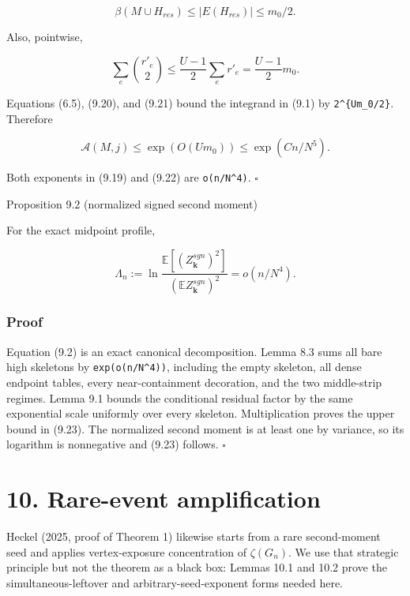 \documentclass[
  11pt,
  a4paper,
]{article}
\begin{document}
\[
 \beta(M\cup H_{res})\le|E(H_{res})|\le m_0/2.           \tag{9.20}
\]

Also, pointwise,

\[
 \sum_e\binom{r'_e}{2}
 \le\frac{U-1}{2}\sum_er'_e=\frac{U-1}{2}m_0.           \tag{9.21}
\]

Equations (6.5), (9.20), and (9.21) bound the integrand in (9.1) by
\texttt{2\^{}\{Um\_0/2\}}. Therefore

\[
 \mathcal A(M,j)\le\exp(O(Um_0))\le\exp(Cn/N^5).       \tag{9.22}
\]

Both exponents in (9.19) and (9.22) are \texttt{o(n/N\^{}4)}.
\(\square\)

{}
\label{proposition-9.2-normalized-signed-second-moment}
\begin{propositionbox}{Proposition 9.2 (normalized signed second moment)}

For the exact midpoint profile,

\[
 \Lambda_n:=\ln\frac{\mathbb E\!\left[(Z_{\mathbf k}^{sgn})^2\right]}
                       {(\mathbb EZ_{\mathbf k}^{sgn})^2}
 =o(n/N^4).                                               \tag{9.23}
\]

\end{propositionbox}

\subsubsection{Proof}\label{proof-8}

Equation (9.2) is an exact canonical decomposition. Lemma 8.3 sums all
bare high skeletons by \texttt{exp(o(n/N\^{}4))}, including the empty
skeleton, all dense endpoint tables, every near-containment decoration,
and the two middle-strip regimes. Lemma 9.1 bounds the conditional
residual factor by the same exponential scale uniformly over every
skeleton. Multiplication proves the upper bound in (9.23). The
normalized second moment is at least one by variance, so its logarithm
is nonnegative and (9.23) follows. \(\square\)

\section{10. Rare-event amplification}\label{rare-event-amplification}

Heckel (2025, proof of Theorem 1) likewise starts from a rare
second-moment seed and applies vertex-exposure concentration of
\(\zeta(G_n)\). We use that strategic principle but not the theorem as a
black box: Lemmas 10.1 and 10.2 prove the simultaneous-leftover and
arbitrary-seed-exponent forms needed here.
\end{document}
